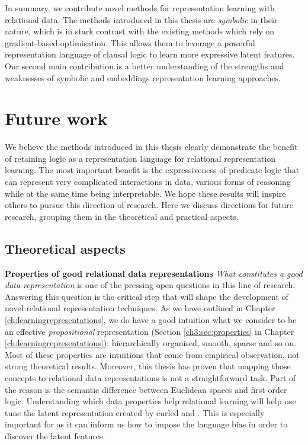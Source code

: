 In summary, we contribute novel methods for representation learning with relational data.
The methods introduced in this thesis are \textit{symbolic} in their nature, which is in stark contrast with the existing methods which rely on gradient-based optimisation.
This allows them to leverage a powerful representation language of clausal logic to learn more expressive latent features.
Our second main contribution is a better understanding of the strengths and weaknesses of symbolic and embeddings representation learning approaches.








\section{Future work}

We believe the methods introduced in this thesis clearly demonstrate the benefit of retaining logic as a representation language for relational representation learning.
The most important benefit is the expressiveness of predicate logic that can represent very complicated interactions in data, various forms of reasoning while at the same time being interpretable.
We hope these results will inspire others to pursue this direction of research.
Here we discuss directions for future research, grouping them in the theoretical and practical aspects.


\subsection{Theoretical aspects}


\textbf{Properties of good relational data representations}
\textit{What constitutes a good data representation} is one of the pressing open  questions in this line of research.
Answering this question is the critical step that will shape the development of novel relational representation techniques.
As we have outlined in Chapter \ref{ch:learningrepresentations}, we do have a good intuition what we consider to be an effective \textit{propositional} representation (Section \ref{ch3:sec:properties} in Chapter \ref{ch:learningrepresentations}): hierarchically organised, smooth, sparse and so on.
Most of these properties are intuitions that come from empirical observation, not strong theoretical results.
Moreover, this thesis has proven that mapping those concepts to relational data representations is not a straightforward task.
Part of the reason is the semantic difference between Euclidean spaces and first-order logic.
Understanding which data properties help relational learning will help use tune the latent representation created by \gls{curled} and .
This is especially important for  as it can inform us how to impose the language bias in order to discover the latent features.





